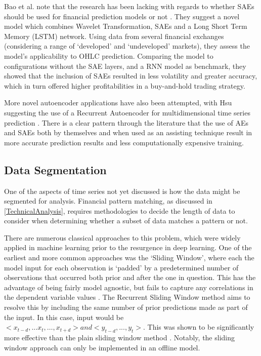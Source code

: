 \documentclass[a4paper,11pt,oneside]{article}
\theoremstyle{plain}
\theoremstyle{definition}
\begin{document}
Bao et al.  note that the research has been lacking with regards to whether SAEs should be used for 
financial prediction models or not \cite{Bao}. They suggest a novel model which combines Wavelet Transformation, SAEs 
and a Long Short Term Memory (LSTM) network. Using data from several financial exchanges (considering a 
range of ‘developed’ and ‘undeveloped’ markets), they assess the model’s applicability to OHLC prediction. 
Comparing the model to configurations without the SAE layers, and a RNN model as benchmark, they showed 
that the inclusion of SAEs resulted in less volatility and greater accuracy, which in turn offered higher profitabilities 
in a buy-and-hold trading strategy.
\hfill \break 

More novel autoencoder applications have also been attempted, with Hsu suggesting the use of a 
Recurrent Autoencoder for multidimensional time series prediction \cite{Hsu}. There is a clear pattern through the literature 
that the use of AEs and SAEs both by themselves and when used as an assisting technique result in more accurate 
prediction results and less computationally expensive training.

\subsection{Data Segmentation}
\hfill

One of the aspects of time series not yet discussed is how the data might be segmented for analysis. 
Financial pattern matching, as discussed in \ref{TechnicalAnalysis}, requires methodologies to decide the length of data to 
consider when determining whether a subset of data matches a pattern or not. 
\hfill\break

There are numerous classical approaches to this problem, which were widely applied in machine learning prior to 
the resurgence in deep learning. One of the earliest and more common approaches was the ‘Sliding Window’, 
where each the model input for each observation is ‘padded’ by a predetermined number of observations that 
occurred both prior and after the one in question. This has the advantage of being fairly model agnostic, but fails 
to capture any correlations in the dependent variable values \cite{Chu}. The Recurrent Sliding Window method 
aims to resolve this by including the same number of prior predictions made as part of the input. In this case, input 
would be ${<x_{t-d},...x_{t},…,x_{t+d}> and <y_{t-d},...,y_t>}$. This was shown to be significantly more effective than the plain 
sliding window method \cite{Bakiri}. Notably, the sliding window approach can only be implemented in an offline 
model.
\hfill\break
\end{document}
